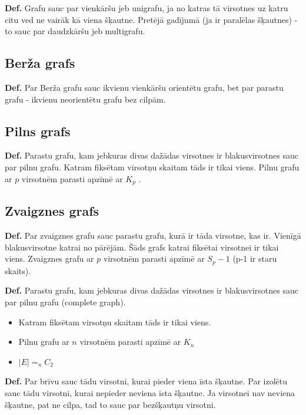 \documentclass{article}
\begin{document}
\textbf{Def.} Grafu sauc par vienkāršu jeb unigrafu, ja no katras tā virsotnes uz katru citu ved ne vairāk kā viena šķautne. Pretējā gadījumā (ja ir paralēlas šķautnes) - to sauc par daudzkāršu jeb multigrafu.


\subsection{Berža grafs}

\textbf{Def.} Par Berža grafu sauc ikvienu vienkāršu orientētu grafu, bet par parastu grafu - ikvienu neorientētu grafu bez cilpām. 


\subsection{Pilns grafs}

\textbf{Def.} Parastu grafu, kam jebkuras divas dažādas virsotnes ir blakusvirsotnes sauc par pilnu grafu. Katram fiksētam virsotņu skaitam tāds ir tikai viens. Pilnu grafu ar $p$ virsotnēm parasti apzīmē ar $K_p$ .

\subsection{Zvaigznes grafs}

\textbf{Def.} Par zvaigznes grafu sauc parastu grafu, kurā ir tāda virsotne, kas ir. Vienīgā blakusvirsotne katrai no pārējām.  Šāds grafs katrai fiksētai virsotnei ir tikai viens. Zvaigznes grafu ar $p$ virsotnēm parasti apzīmē ar $S_p−1$ (p-1 ir staru skaits).


\textbf{Def.}  Parastu grafu, kam jebkuras divas dažādas virsotnes ir blakusvirsotnes sauc par pilnu grafu (complete graph).

\begin{itemize}
	\item Katram fiksētam virsotņu skaitam tāds ir tikai viens.
	\item Pilnu grafu ar $n$ virsotnēm parasti apzīmē ar $K_n$ 
	\item $|E | =_n C_2$
\end{itemize}

\textbf{Def.}  Par brīvu sauc tādu virsotni, kurai pieder viena īsta šķautne. Par izolētu sauc tādu virsotni, kurai nepieder neviena īsta šķautne.  Ja virsotnei nav neviena šķautne, pat ne cilpa, tad to sauc par bezšķautņu virsotni.
\end{document}
